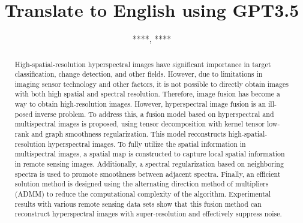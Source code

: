 \documentclass[journal]{IEEEtran}%
\title{Translate to English using GPT3.5}%
\author{****, ****}%
\begin{document}
%
\normalsize%
\maketitle%
\begin{abstract}


High-spatial-resolution hyperspectral images have significant importance in target classification, change detection, and other fields. However, due to limitations in imaging sensor technology and other factors, it is not possible to directly obtain images with both high spatial and spectral resolution. Therefore, image fusion has become a way to obtain high-resolution images. However, hyperspectral image fusion is an ill-posed inverse problem. To address this, a fusion model based on hyperspectral and multispectral images is proposed, using tensor decomposition with kernel tensor low-rank and graph smoothness regularization. This model reconstructs high-spatial-resolution hyperspectral images. To fully utilize the spatial information in multispectral images, a spatial map is constructed to capture local spatial information in remote sensing images. Additionally, a spectral regularization based on neighboring spectra is used to promote smoothness between adjacent spectra. Finally, an efficient solution method is designed using the alternating direction method of multipliers (ADMM) to reduce the computational complexity of the algorithm. Experimental results with various remote sensing data sets show that this fusion method can reconstruct hyperspectral images with super-resolution and effectively suppress noise.
\end{abstract}%
\end{document}
